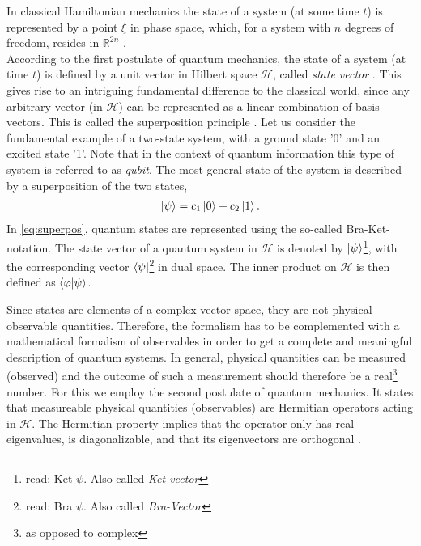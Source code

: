 In classical Hamiltonian mechanics the state of a system (at some time $t$) is
represented by a point $\xi$ in phase space, which, for a system with $n$
degrees of freedom, resides in $\mathbb{R}^{2n}$
\cite{noltingHamiltonMechanik2014}.\\
According to the first postulate of quantum mechanics, the state of a system
(at time $t$) is defined by a unit vector in Hilbert space $\mathcal{H}$,
called \emph{state vector} \cite{cohen-tannoudjiQuantumMechanicsVolume1977}.
This gives rise to an
intriguing fundamental difference to the classical world, since any arbitrary
vector (in $\mathcal{H}$) can be represented as a linear combination of basis
vectors.  This is called the superposition principle
\cite{poschelFourierreihen2015, messiahQuantumMechanics1991}.
Let us consider the fundamental example of a two-state system, with a ground state '0' and an excited state '1'.
Note that in the context of quantum information this type of system is referred to as \emph{qubit}.
The most general state of the system is described by a superposition of the two states,  
\begin{align}\label{eq:superpos}
    \ket{\psi} = c_1 \ket{0} + c_2 \ket{1}.
\end{align}
In \cref{eq:superpos}, quantum states are represented using the so-called Bra-Ket-notation. 
The state vector of a quantum system in $\mathcal{H}$ is denoted by $\ket{\psi}$\footnote{read: Ket $\psi$. Also called \emph{Ket-vector}},
with the corresponding vector $\bra{\psi}$\footnote{read: Bra $\psi$. Also called \emph{Bra-Vector}} in dual space.
The inner product on $\mathcal{H}$ is then defined as
$\braket{\varphi}{\psi}$.
\par
Since states are elements of a complex vector space, they are not physical observable quantities. Therefore, the formalism
has to be complemented with a mathematical formalism of observables in order to get a complete and meaningful description of quantum systems.
In general, physical quantities can be measured (observed) and the outcome of such a measurement should therefore be
a real\footnote{as opposed to complex} number.
For this we employ the second postulate of quantum mechanics. It states that measureable physical quantities
(observables) are Hermitian operators acting in $\mathcal{H}$. 
The Hermitian property implies that the operator only has real eigenvalues, is diagonalizable,
and that its eigenvectors are orthogonal \cite{messiahQuantumMechanics1991}.\\
